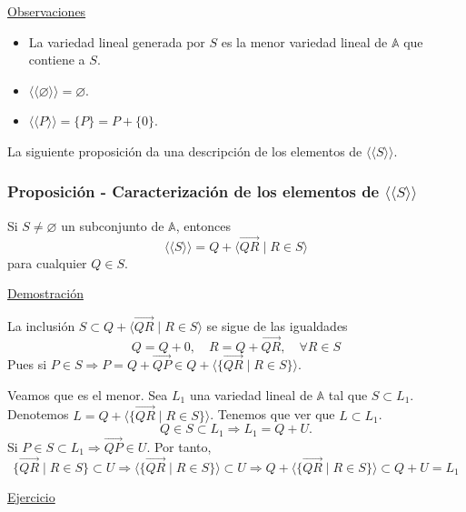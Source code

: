 \documentclass[12pt, a4paper, ones, notitlepage, openany,titlepage]{article}
\begin{document}
\noindent\underline{Observaciones}
\begin{itemize}
\item La variedad lineal generada por $S$ es la menor variedad lineal de $\mathbb{A}$ que contiene a $S$.
\item $\langle\langle \varnothing \rangle\rangle = \varnothing$.
\item $\langle\langle P \rangle\rangle = \{P\} = P + \{0\}$.
\end{itemize}
La siguiente proposición da una descripción de los elementos de $\langle\langle S\rangle\rangle$.

\subsubsection{Proposición - Caracterización de los elementos de $\langle\langle S\rangle\rangle$}
\noindent Si $S \neq \varnothing$ un subconjunto de $\mathbb{A}$, entonces
$$
\langle\langle S\rangle\rangle=Q+\langle\overrightarrow{Q R} \mid R \in S\rangle
$$
\noindent para cualquier $Q \in S$.

\noindent\underline{Demostración}

\noindent La inclusión $S \subset Q+\langle\overrightarrow{Q R} \mid R \in S\rangle$ se sigue de las igualdades
$$
Q=Q+0, \quad R=Q+\overrightarrow{Q R}, \quad \forall R \in S
$$
Pues si $P \in S \Longrightarrow P = Q + \overrightarrow{QP} \in Q + \langle \{\overrightarrow{QR} \mid R \in S\} \rangle$.

Veamos que es el menor. Sea $L_1$ una variedad lineal de $\mathbb{A}$ tal que $S \subset L_1$. Denotemos $L = Q + \langle\{\overrightarrow{QR} \mid R \in S\}\rangle$. Tenemos que ver que $L \subset L_1$.
$$
Q \in S \subset L_1 \Longrightarrow L_1 = Q + U.
$$
Si $P \in S \subset L_1 \Longrightarrow \overrightarrow{QP} \in U$. Por tanto,
$$
\{\overrightarrow{QR} \mid R \in S\} \subset U \Longrightarrow \langle \{\overrightarrow{QR} \mid R \in S\} \rangle \subset U \Longrightarrow Q + \langle\{\overrightarrow{QR} \mid R \in S\}\rangle \subset Q + U = L_1
$$

\noindent\underline{Ejercicio}
	
\end{document}
